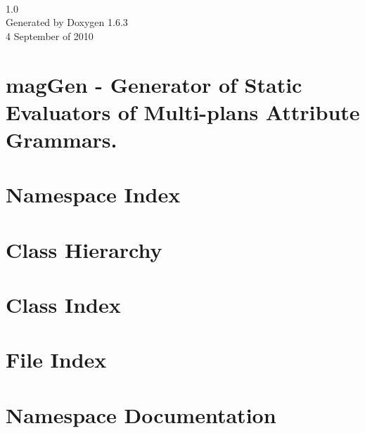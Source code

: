\documentclass[a4paper,10pt]{book}
\begin{document}
\begin{titlepage}
\vspace*{7cm}
\begin{center}
{\fontsize{5em}{5em}\selectfont\textbf{\textit{}} \\[1ex]\large 1.0 }\\
\vspace*{1cm}
{\large Generated by Doxygen 1.6.3}\\
\vspace*{0.5cm}
{\small{4 September of 2010}}

\end{center}
\end{titlepage}
\clearemptydoublepage
{}
\tableofcontents
\clearemptydoublepage
{}
\chapter{magGen - Generator of Static Evaluators of Multi-plans Attribute Grammars.}
\label{index}\hypertarget{index}{}
\chapter{Namespace Index}

\chapter{Class Hierarchy}

\chapter{Class Index}

\chapter{File Index}

\chapter{Namespace Documentation}


\end{document}

